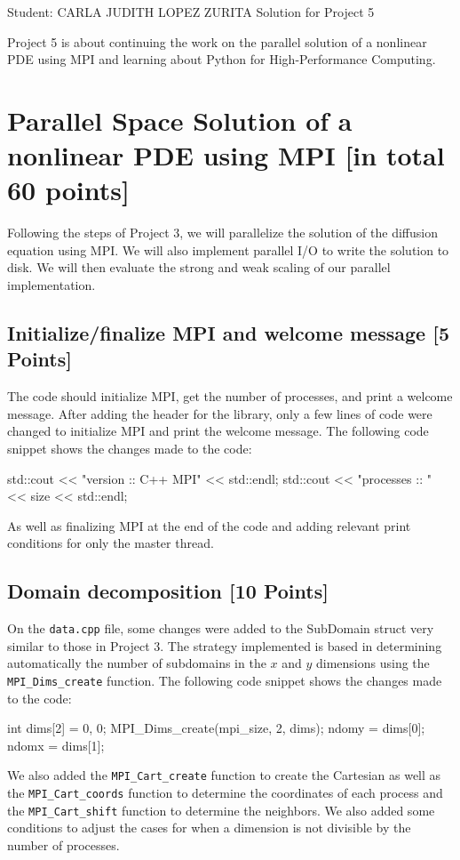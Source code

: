 \documentclass[unicode,11pt,a4paper,oneside,numbers=endperiod,openany]{scrartcl}
\begin{document}
\setassignment
{}

            {Student: CARLA JUDITH LOPEZ ZURITA}
            { }{Solution for Project 5}{}
\newline

\assignmentpolicy


Project 5 is about continuing the work on the parallel solution of a nonlinear
PDE using MPI and learning about Python for High-Performance Computing.

\section{Parallel Space Solution of a nonlinear PDE using MPI
         [in total 60 points]}
Following the steps of Project 3, we will parallelize the solution of the
diffusion equation using MPI. We will also implement parallel I/O to write
the solution to disk. We will then evaluate the strong and weak scaling of
our parallel implementation.
\subsection{Initialize/finalize MPI and welcome message [5 Points]}
The code should initialize MPI, get the number of processes, and print a welcome
message. After adding the header for the library, only a few lines of code were changed to initialize MPI and print the welcome message. The following code snippet shows the changes made to the code:
\begin{cppverbatim}
std::cout << "version   :: C++ MPI" << std::endl;
std::cout << "processes :: " << size << std::endl;
\end{cppverbatim}
As well as finalizing MPI at the end of the code and adding relevant print
conditions for only the master thread.
\subsection{Domain decomposition [10 Points]}

On the \texttt{data.cpp} file, some changes were added to the SubDomain struct
very similar to those in Project 3.  The
strategy implemented is based in determining automatically the number of
subdomains in the $x$ and $y$ dimensions using the \texttt{MPI\_Dims\_create}
function. The following code snippet shows the changes made to the code:
\begin{cppverbatim}
int dims[2] = {0, 0};
MPI_Dims_create(mpi_size, 2, dims);
ndomy = dims[0];
ndomx = dims[1];
\end{cppverbatim}
We also added the \texttt{MPI\_Cart\_create} function to create the Cartesian as
well as the \texttt{MPI\_Cart\_coords} function to determine the coordinates of
each process and the \texttt{MPI\_Cart\_shift} function to determine the neighbors.
We also added some conditions to adjust the
cases for when a dimension is not divisible by the number of processes.
\end{document}
